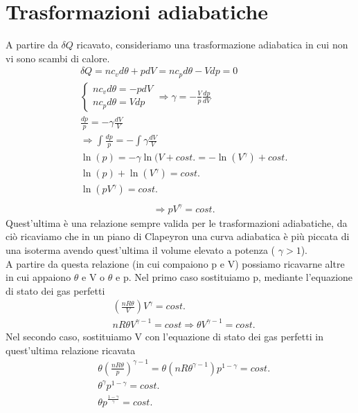 \documentclass[10pt,a4paper]{article}
\begin{document}
\section{Trasformazioni adiabatiche}
A partire da $\delta Q$ ricavato, consideriamo una trasformazione adiabatica in cui non vi sono scambi di calore. 
\begin{align*}
	&\delta Q = n c_v d\theta + pdV = n c_p d\theta - Vdp = 0\\
	&\begin{cases}
		n c_v d\theta = -pdV\\
		n c_p d\theta = V dp
	\end{cases} \Rightarrow \gamma = - \frac{V}{p}\frac{dp}{dV}\\
	& \frac{dp}{p} = -\gamma \frac{dV}{V} \\
	&\Rightarrow \int\frac{dp}{p} = -\int\gamma \frac{dV}{V}\\
	&\ln(p) = -\gamma \ln(V + cost. = -\ln(V^{\gamma}) + cost.\\
	&\ln(p)+\ln(V^{\gamma}) = cost.\\
	&\ln(pV^{\gamma}) = cost.\\
\end{align*}
\begin{align}\label{eq:adiabatica1}
	&\Rightarrow pV^{\gamma} = cost.
\end{align}
Quest'ultima è una relazione sempre valida per le trasformazioni adiabatiche, da ciò ricaviamo che in un piano di Clapeyron una curva adiabatica è più piccata di una isoterma avendo quest'ultima il volume elevato a potenza ( \(\gamma > 1\)).\\
A partire da questa relazione (in cui compaiono p e V) possiamo ricavarne altre in cui appaiono \(\theta\) e V o \(\theta\) e p. Nel primo caso sostituiamo p, mediante l'equazione di stato dei gas perfetti
\begin{align}\label{eq:adiabatica2}
	&\left(\frac{n R \theta}{V}\right)V^{\gamma} = cost.\nonumber\\
	&n R \theta V^{\gamma - 1} = cost \Rightarrow \theta V ^{\gamma-1}= cost.
\end{align}
Nel secondo caso, sostituiamo V con l'equazione di stato dei gas perfetti in quest'ultima relazione ricavata
\begin{align}\label{eq:adiabatica3}
	&\theta \left(\frac{n R \theta}{p} \right)^{\gamma-1}= \theta (n R \theta^{\gamma-1}) p^{1-\gamma}= cost.\nonumber\\
	&\theta^{\gamma} p^{1-\gamma}= cost.\nonumber\\
	&\theta p^{\frac{1-\gamma}{\gamma}} = cost.
\end{align}
\end{document}
